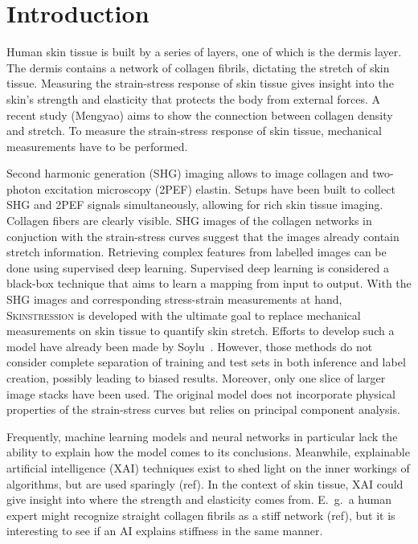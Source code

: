 \chapter{Introduction}

Human skin tissue is built by a series of layers, one of which is the dermis layer.
The dermis contains a network of collagen fibrils, dictating the stretch of skin tissue.
Measuring the strain-stress response of skin tissue gives insight into the skin's strength and elasticity that protects the body from external forces.
A recent study (Mengyao) aims to show the connection between collagen density and stretch.
To measure the strain-stress response of skin tissue, mechanical measurements have to be performed.

Second harmonic generation (SHG) imaging allows to image collagen and two-photon excitation microscopy (2PEF) elastin.
Setups have been built to collect SHG and 2PEF signals simultaneously, allowing for rich skin tissue imaging.
Collagen fibers are clearly visible.
SHG images of the collagen networks in conjuction with the strain-stress curves suggest that the images already contain stretch information.
Retrieving complex features from labelled images can be done using supervised deep learning.
Supervised deep learning is considered a black-box technique that aims to learn a mapping from input to output.
With the SHG images and corresponding stress-strain measurements at hand, \textsc{Skinstression} is developed with the ultimate goal to replace mechanical measurements on skin tissue to quantify skin stretch.
Efforts to develop such a model have already been made by Soylu~\cite{Soylu2022}.
However, those methods do not consider complete separation of training and test sets in both inference and label creation, possibly leading to biased results.
Moreover, only one slice of larger image stacks have been used.
The original model does not incorporate physical properties of the strain-stress curves but relies on principal component analysis.

Frequently, machine learning models and neural networks in particular lack the ability to explain how the model comes to its conclusions.
Meanwhile, explainable artificial intelligence (XAI) techniques exist to shed light on the inner workings of algorithms, but are used sparingly (ref).
In the context of skin tissue, XAI could give insight into where the strength and elasticity comes from.
E.\ g.\ a human expert might recognize straight collagen fibrils as a stiff network (ref), but it is interesting to see if an AI explains stiffness in the same manner.

